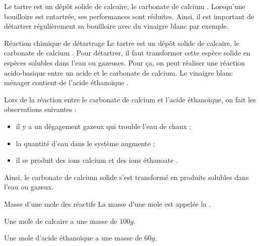 \teteSndChim
\vspace*{-6pt}
\nomPrenomClasse



\begin{contexte}
  Le tartre est un dépôt solide de calcaire, le carbonate de calcium .
  Lorsqu'une bouilloire est entartrée, ses performances sont réduites.
  Ainsi, il est important de détartrer régulièrement sa bouilloire avec du vinaigre blanc par exemple.
\end{contexte}


\begin{doc}{Réaction chimique de détartrage}
  \label{doc:reaction_detartrage}
  Le tartre est un dépôt solide de calcaire, le carbonate de calcium .
  Pour détartrer, il faut transformer cette espèce solide en espèces solubles dans l'eau ou gazeuses.
  Pour ça, on peut réaliser une réaction acido-basique entre un acide et le carbonate de calcium.
  Le vinaigre blanc ménager contient de l'acide éthanoïque .

  Lors de la réaction entre le carbonate de calcium et l'acide éthanoïque, on fait les observations suivantes :
  \begin{itemize}
    \item il y a un dégagement gazeux qui trouble l'eau de chaux ;
    \item la quantité d'eau dans le système augmente ;
    \item il se produit des ions calcium  et des ions éthanoate .
  \end{itemize}
    
  Ainsi, le carbonate de calcium solide s'est transformé en produits solubles dans l'eau ou gazeux.
\end{doc}

\begin{doc}{Masse d'une mole des réactifs}
  La masse d'une mole est appelée la .

  \begin{donnees}
    \item Une mole de calcaire  a une masse de $100 \unit{g}$.
    \item Une mole d'acide éthanoïque  a une masse de $60 \unit{g}$.
  \end{donnees}
\end{doc}

